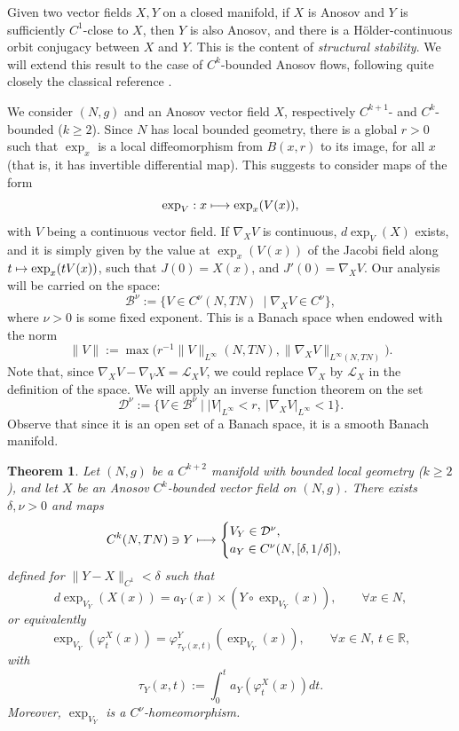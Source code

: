 \documentclass[10pt]{amsart}
\newcommand\mto{\mathchoice{\longmapsto}{\mapsto}{\mapsto}{\mapsto}}
\newcommand{\R}{\mathbb{R}}
\theoremstyle{plain}
\newtheorem{theorem}{Theorem}[section]
\theoremstyle{definition}
\begin{document}
Given two vector fields $X,Y$ on a closed manifold, if $X$ is Anosov and $Y$ is sufficiently $C^1$-close to $X$, then $Y$ is also Anosov, and there is a Hölder-continuous orbit conjugacy between $X$ and $Y$. This is the content of \emph{structural stability}. We will extend this result to the case of $C^k$-bounded Anosov flows, following quite closely the classical reference \cite[App.\,A]{DeLaLlave-Marco-Moryon-86}.

We consider $(N,g)$ and an Anosov vector field $X$, respectively $C^{k+1}$- and $C^k$-bounded ($k\geq 2$). Since $N$ has local bounded geometry, there is a global $r>0$ such that $\exp_x$ is a local diffeomorphism from $B(x,r)$ to its image, for all $x$ (that is, it has invertible differential map). This suggests to consider maps of the form
\[
\exp_V : x \mto \exp_x(V(x)),
\]
with $V$ being a continuous vector field. If $\nabla_X V$ is continuous, $d \exp_V(X)$ exists, and it is simply given by the value at $\exp_x(V(x))$ of the Jacobi field along $t\mto \exp_x(t V(x))$, such that $J(0) = X(x)$, and $J'(0) = \nabla_X V$. Our analysis will be carried on the space:
\[
\mathcal{B}^\nu :=\{ V \in C^\nu(N, TN)\ \mid \nabla_X V \in C^\nu\},
\]
where $\nu > 0$ is some fixed exponent. This is a Banach space when endowed with the norm
\[
\|V\|:=\max\bigl( r^{-1} \| V\|_{L^\infty}(N,TN), \| \nabla_X V\|_{L^\infty(N,TN)}\bigr).
\]
Note that, since $\nabla_X V - \nabla_V X = \mathcal{L}_X V$, we could replace $\nabla_X$ by $\mathcal{L}_X$ in the definition of the space. We will apply an inverse function theorem on the set
\[
\mathcal{D}^\nu:=\{V \in \mathcal{B}^\nu\mid |V|_{L^\infty} < r,\ |\nabla_X V|_{L^\infty} < 1\}.
\]
Observe that since it is an open set of a Banach space, it is a smooth Banach manifold.

\begin{theorem}\label{thm:homeo-Anosov}
Let $(N,g)$ be a $C^{k+2}$ manifold with bounded local geometry ($k\geq 2$), and let $X$ be an Anosov $C^k$-bounded vector field on $(N,g)$. There exists $\delta,\nu>0$ and maps
\[
C^{k}(N,TN)\owns Y \mto \begin{cases} V_Y\in \mathcal{D}^\nu, \\ a_Y \in C^\nu(N,[\delta, 1/\delta]),\end{cases}
\]
defined for $\| Y - X \|_{C^1} < \delta$ such that
\[
d \exp_{V_Y}(X(x)) = a_Y(x)\times( Y\circ \exp_{V_Y}(x)), \qquad \forall x \in N,
\]
or equivalently
\[
\exp_{V_Y}(\varphi^X_t( x )) = \varphi^Y_{\tau_Y(x,t)}(\exp_{V_Y}(x)), \qquad \forall x \in N,\, t \in \R,
\]
with
\[
\tau_Y(x,t) := \int_0^t a_Y(\varphi^X_t(x))dt.
\]
Moreover, $\exp_{V_Y}$ is a $C^\nu$-homeomorphism.
\end{theorem}
\end{document}
